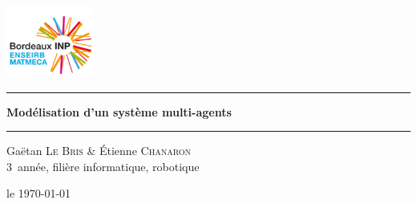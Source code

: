 

\begin{titlepage}
\begingroup

\hfill
\includegraphics[height=66pt]{images/logos/logo_enseirb_matmeca.png}
\hfill
\vspace*{0.1\textheight}

\begin{center}

\rule{\textwidth}{1pt}\par
\vspace{0.5\baselineskip}
{\huge\bfseries Modélisation d'un système multi-agents}
\rule{\textwidth}{1pt}\par
\vfill

{\large Gaëtan \textsc{Le Bris} \& Étienne \textsc{Chanaron}\\ 3\ieme\ année, filière informatique, robotique}
\vfill

\huge{\starredbullet}
\vfill

{\large le \today}

\end{center}
\endgroup
\end{titlepage}
